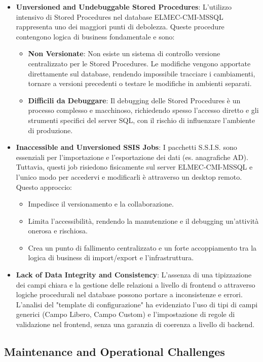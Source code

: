 \begin{itemize}
\item \textbf{Unversioned and Undebuggable Stored Procedures}: L'utilizzo intensivo di Stored Procedures nel database ELMEC-CMI-MSSQL rappresenta uno dei maggiori punti di debolezza. Queste procedure contengono logica di business fondamentale e sono:
\begin{itemize}
\item \textbf{Non Versionate}: Non esiste un sistema di controllo versione centralizzato per le Stored Procedures. Le modifiche vengono apportate direttamente sul database, rendendo impossibile tracciare i cambiamenti, tornare a versioni precedenti o testare le modifiche in ambienti separati.
\item \textbf{Difficili da Debuggare}: Il debugging delle Stored Procedures è un processo complesso e macchinoso, richiedendo spesso l'accesso diretto e gli strumenti specifici del server SQL, con il rischio di influenzare l'ambiente di produzione.
\end{itemize}
\item \textbf{Inaccessible and Unversioned SSIS Jobs}: I pacchetti S.S.I.S. sono essenziali per l'importazione e l'esportazione dei dati (es. anagrafiche AD). Tuttavia, questi job risiedono fisicamente sul server ELMEC-CMI-MSSQL e l'unico modo per accedervi e modificarli è attraverso un desktop remoto. Questo approccio:
\begin{itemize}
\item Impedisce il versionamento e la collaborazione.
\item Limita l'accessibilità, rendendo la manutenzione e il debugging un'attività onerosa e rischiosa.
\item Crea un punto di fallimento centralizzato e un forte accoppiamento tra la logica di business di import/export e l'infrastruttura.
\end{itemize}
\item \textbf{Lack of Data Integrity and Consistency}: L'assenza di una tipizzazione dei campi chiara e la gestione delle relazioni a livello di frontend o attraverso logiche procedurali nel database possono portare a inconsistenze e errori. L'analisi del "template di configurazione" ha evidenziato l'uso di tipi di campi generici (Campo Libero, Campo Custom) e l'impostazione di regole di validazione nel frontend, senza una garanzia di coerenza a livello di backend.
\end{itemize}

\subsection{Maintenance and Operational Challenges}

